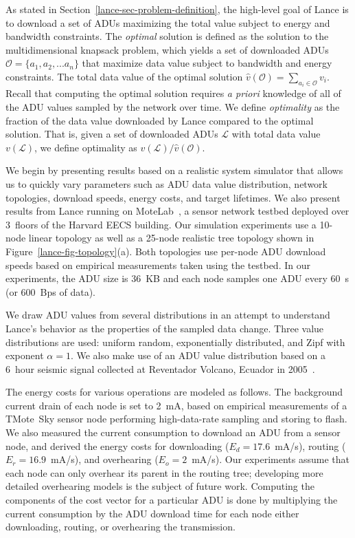 As stated in Section~\ref{lance-sec-problem-definition}, the high-level goal
of Lance is to download a set of ADUs maximizing the total value subject to
energy and bandwidth constraints. The \textit{optimal} solution is defined as
the solution to the multidimensional knapsack problem, which yields a set of
downloaded ADUs $\mathcal{O} = \{a_1, a_2, ... a_n\}$ that maximize data
value subject to bandwidth and energy constraints. The total data value of
the optimal solution $\hat{v}(\mathcal{O}) = \sum_{a_i \in \mathcal{O}} v_i$.
Recall that computing the optimal solution requires \textit{a priori}
knowledge of all of the ADU values sampled by the network over time. We
define \textit{optimality} as the fraction of the data value downloaded by
Lance compared to the optimal solution. That is, given a set of downloaded
ADUs $\mathcal{L}$ with total data value $v(\mathcal{L})$, we define
optimality as $v(\mathcal{L}) / \hat{v}(\mathcal{O})$.

We begin by presenting results based on a realistic system simulator that
allows us to quickly vary parameters such as ADU data value distribution,
network topologies, download speeds, energy costs, and target lifetimes. We
also present results from Lance running on MoteLab~\cite{motelab}, a sensor
network testbed deployed over 3~floors of the Harvard EECS building. Our
simulation experiments use a 10-node linear topology as well as a 25-node
realistic tree topology shown in Figure~\ref{lance-fig-topology}(a).
Both topologies use per-node ADU download speeds based on empirical
measurements taken using the testbed. In our experiments, the ADU size is
36~KB and each node samples one ADU every 60~s (or 600~Bps of data).

We draw ADU values from several distributions in an attempt to understand
Lance's behavior as the properties of the sampled data change. Three value
distributions are used: uniform random, exponentially distributed, and Zipf
with exponent $\alpha = 1$. We also make use of an ADU value distribution
based on a 6~hour seismic signal collected at Reventador Volcano, Ecuador in
2005~\cite{volcano-osdi06}.

The energy costs for various operations are modeled as follows. The
background current drain of each node is set to 2~mA, based on empirical
measurements of a TMote~Sky sensor node performing high-data-rate sampling
and storing to flash. We also measured the current consumption to download an
ADU from a sensor node, and derived the energy costs for downloading ($E_d =
17.6$~mA/s), routing ($E_r = 16.9$~mA/s), and overhearing ($E_o = 2$~mA/s).
Our experiments assume that each node can only overhear its parent in the
routing tree; developing more detailed overhearing models is the subject of
future work. Computing the components of the cost vector for a particular ADU
is done by multiplying the current consumption by the ADU download time for
each node either downloading, routing, or overhearing the transmission.

